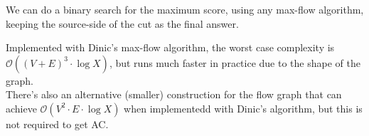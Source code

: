 We can do a binary search for the maximum score, using any max-flow algorithm, keeping the source-side of the cut as the final answer.

Implemented with Dinic's max-flow algorithm, the worst case complexity is $\mathcal{O}((V + E)^3 \cdot \log X)$, but runs much faster in practice due to the shape of the graph. \\
There's also an alternative (smaller) construction for the flow graph that can achieve $\mathcal{O}(V^2 \cdot E \cdot \log X)$ when implementedd with Dinic's algorithm, but this is not required to get AC.
